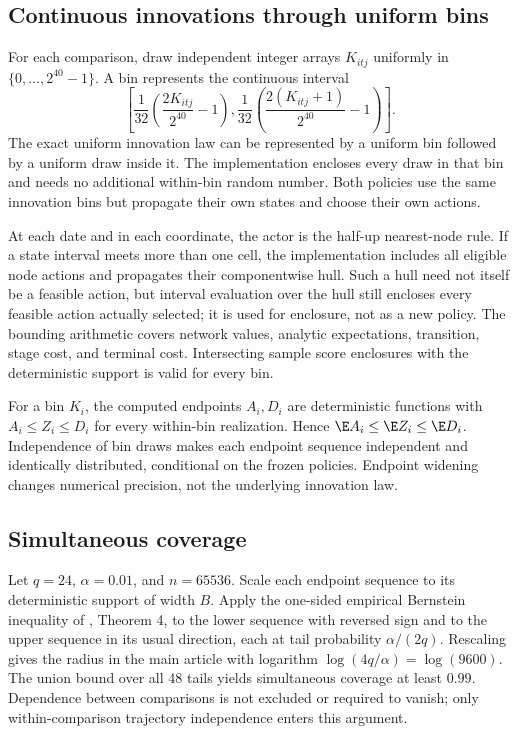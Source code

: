 \documentclass[ecta,nameyear,draft]{econsocart}
\begin{document}
\subsection{Continuous innovations through uniform bins}
For each comparison, draw independent integer arrays $K_{itj}$ uniformly in $\{0,\ldots,2^{40}-1\}$. A bin represents the continuous interval
\[
 \left[\frac1{32}\left(\frac{2K_{itj}}{2^{40}}-1\right),
       \frac1{32}\left(\frac{2(K_{itj}+1)}{2^{40}}-1\right)\right].
\]
The exact uniform innovation law can be represented by a uniform bin followed by a uniform draw inside it. The implementation encloses every draw in that bin and needs no additional within-bin random number. Both policies use the same innovation bins but propagate their own states and choose their own actions.

At each date and in each coordinate, the actor is the half-up nearest-node rule. If a state interval meets more than one cell, the implementation includes all eligible node actions and propagates their componentwise hull. Such a hull need not itself be a feasible action, but interval evaluation over the hull still encloses every feasible action actually selected; it is used for enclosure, not as a new policy. The bounding arithmetic covers network values, analytic expectations, transition, stage cost, and terminal cost. Intersecting sample score enclosures with the deterministic support is valid for every bin.

For a bin $K_i$, the computed endpoints $A_i,D_i$ are deterministic functions with $A_i\leq Z_i\leq D_i$ for every within-bin realization. Hence $\E A_i\leq\E Z_i\leq\E D_i$. Independence of bin draws makes each endpoint sequence independent and identically distributed, conditional on the frozen policies. Endpoint widening changes numerical precision, not the underlying innovation law.

\subsection{Simultaneous coverage}
Let $q=24$, $\alpha=0.01$, and $n=65536$. Scale each endpoint sequence to its deterministic support of width $B$. Apply the one-sided empirical Bernstein inequality of \citet{maurer2009}, Theorem 4, to the lower sequence with reversed sign and to the upper sequence in its usual direction, each at tail probability $\alpha/(2q)$. Rescaling gives the radius in the main article with logarithm $\log(4q/\alpha)=\log(9600)$. The union bound over all 48 tails yields simultaneous coverage at least $0.99$. Dependence between comparisons is not excluded or required to vanish; only within-comparison trajectory independence enters this argument.
\end{document}
